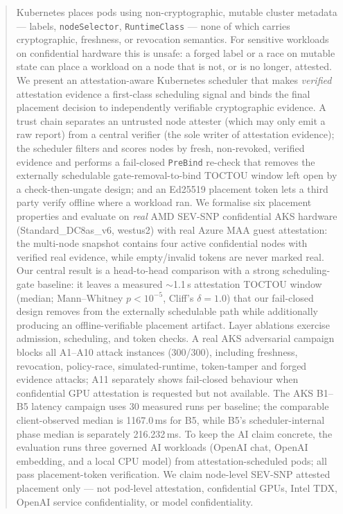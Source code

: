 \begin{abstract}
Kubernetes places pods using non-cryptographic, mutable cluster metadata --- labels,
\texttt{nodeSelector}, \texttt{RuntimeClass} --- none of which carries
cryptographic, freshness, or revocation semantics. For sensitive workloads on
confidential hardware this is unsafe: a forged label or a race on mutable state
can place a workload on a node that is not, or is no longer, attested. We present
an attestation-aware Kubernetes scheduler that makes \emph{verified} attestation
evidence a first-class scheduling signal and binds the final placement decision
to independently verifiable cryptographic evidence. A trust chain separates an
untrusted node attester (which may only emit a raw report) from a central
verifier (the sole writer of attestation evidence); the scheduler filters and
scores nodes by fresh, non-revoked, verified evidence and performs a fail-closed
\texttt{PreBind} re-check that removes the externally schedulable
gate-removal-to-bind TOCTOU window left open by a check-then-ungate design; and
an Ed25519 placement token lets a third party verify offline where a workload
ran. We formalise six
placement properties and evaluate on \emph{real} AMD SEV-SNP confidential AKS
hardware (Standard\_DC8as\_v6, westus2) with real Azure MAA guest attestation:
the multi-node snapshot contains four active confidential nodes with verified
real evidence, while empty/invalid tokens are never marked real. Our
central result is a head-to-head comparison with a strong scheduling-gate
baseline: it leaves a measured $\sim$1.1\,s attestation TOCTOU window (median;
Mann--Whitney $p<10^{-5}$, Cliff's $\delta{=}1.0$) that our fail-closed design
removes from the externally schedulable path while additionally producing an
offline-verifiable placement artifact. Layer ablations exercise admission,
scheduling, and token checks. A real AKS adversarial campaign blocks all A1--A10
attack instances (300/300), including
freshness, revocation, policy-race, simulated-runtime, token-tamper and forged
evidence attacks; A11 separately shows fail-closed behaviour when confidential
GPU attestation is requested but not available. The AKS B1--B5 latency campaign
uses 30 measured runs per baseline; the comparable client-observed median is
1167.0\,ms for B5, while B5's scheduler-internal phase median is separately
216.232\,ms. To keep the AI claim concrete, the evaluation runs three governed
AI workloads (OpenAI chat, OpenAI embedding, and a local CPU model) from
attestation-scheduled pods; all pass placement-token verification. We claim
node-level SEV-SNP attested placement only --- not pod-level attestation,
confidential GPUs, Intel TDX, OpenAI service confidentiality, or model
confidentiality.
\end{abstract}
